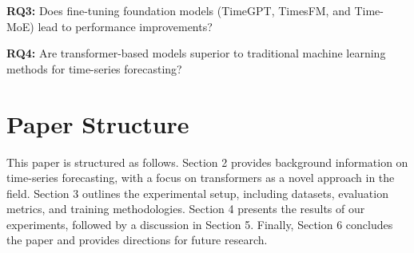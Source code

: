 \textbf{RQ3:} Does fine-tuning foundation models (TimeGPT, TimesFM, and Time-MoE) lead to performance improvements?
    
\textbf{RQ4:} Are transformer-based models superior to traditional machine learning methods for time-series forecasting?



\section{Paper Structure}

This paper is structured as follows. Section 2 provides background information on time-series forecasting, with a focus on transformers as a novel approach in the field. Section 3 outlines the experimental setup, including datasets, evaluation metrics, and training methodologies. Section 4 presents the results of our experiments, followed by a discussion in Section 5. Finally, Section 6 concludes the paper and provides directions for future research.

